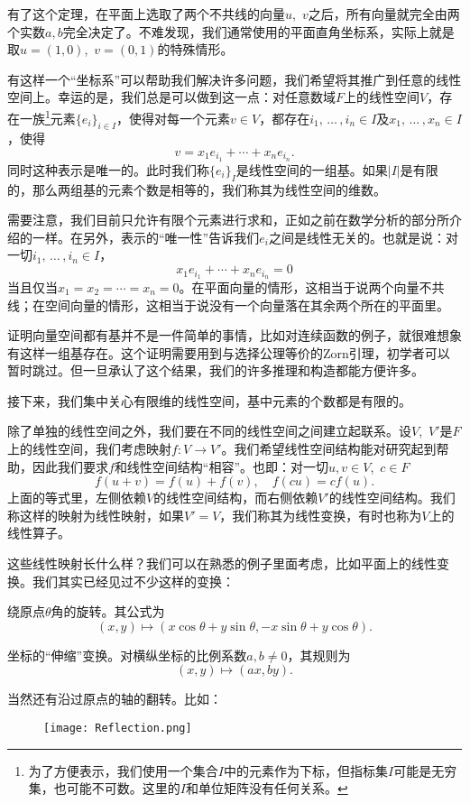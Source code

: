 有了这个定理，在平面上选取了两个不共线的向量$u$,~$v$之后，所有向量就完全由两个实数$a,b$完全决定了。不难发现，我们通常使用的平面直角坐标系，实际上就是取$u=(1,0)$,~$v=(0,1)$的特殊情形。

有这样一个“坐标系”可以帮助我们解决许多问题，我们希望将其推广到任意的线性空间上。幸运的是，我们总是可以做到这一点：对任意数域$F$上的线性空间$V$，存在一族\footnote{为了方便表示，我们使用一个集合$I$中的元素作为下标，但指标集$I$可能是无穷集，也可能不可数。这里的$I$和单位矩阵没有任何关系。}元素$\{e_i\}_{i\in I}$，使得对每一个元素$v\in V$，都存在$i_1,\,\dots\,,i_n\in I$及$x_1,\,\dots\,,x_n\in I$，使得
\[v=x_1e_{i_1}+\cdots +x_ne_{i_n}.\]
同时这种表示是唯一的。此时我们称$\{e_i\}_I$是线性空间的一组基。如果$|I|$是有限的，那么两组基的元素个数是相等的，我们称其为线性空间的维数。

需要注意，我们目前只允许有限个元素进行求和，正如之前在数学分析的部分所介绍的一样。在另外，表示的“唯一性”告诉我们$e_i$之间是线性无关的。也就是说：对一切$i_1,\,\dots\,,i_n\in I$，
\[x_1e_{i_1}+\cdots +x_ne_{i_n}=0\]
当且仅当$x_1=x_2=\cdots =x_n=0$。在平面向量的情形，这相当于说两个向量不共线；在空间向量的情形，这相当于说没有一个向量落在其余两个所在的平面里。

证明向量空间都有基并不是一件简单的事情，比如对连续函数的例子，就很难想象有这样一组基存在。这个证明需要用到与选择公理等价的Zorn引理，初学者可以暂时跳过。但一旦承认了这个结果，我们的许多推理和构造都能方便许多。

接下来，我们集中关心有限维的线性空间，基中元素的个数都是有限的。

除了单独的线性空间之外，我们要在不同的线性空间之间建立起联系。设$V$,~$V'$是$F$上的线性空间，我们考虑映射$f:V\to V'$。我们希望线性空间结构能对研究起到帮助，因此我们要求$f$和线性空间结构“相容”。也即：对一切$u,v\in V$,~$c\in F$
\[f(u+v)=f(u)+f(v),\quad f(cu)=cf(u).\]
上面的等式里，左侧依赖$V$的线性空间结构，而右侧依赖$V'$的线性空间结构。我们称这样的映射为线性映射，如果$V'=V$，我们称其为线性变换，有时也称为$V$上的线性算子。

这些线性映射长什么样？我们可以在熟悉的例子里面考虑，比如平面上的线性变换。我们其实已经见过不少这样的变换：

绕原点$\theta$角的旋转。其公式为
\[(x,y)\mapsto (x\cos\theta+y\sin \theta,-x\sin\theta+y\cos\theta).\]

坐标的“伸缩”变换。对横纵坐标的比例系数$a,b\neq 0$，其规则为
\[(x,y)\mapsto(ax, by).\]

当然还有沿过原点的轴的翻转。比如：

\begin{figure}[h]
    \centering
    \texttt{[image: Reflection.png]}
\end{figure}

